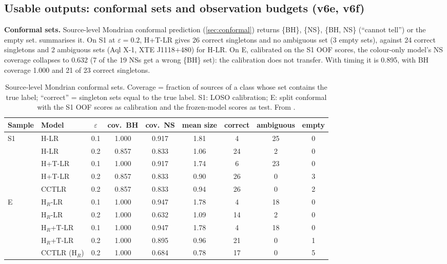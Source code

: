 \subsection{Usable outputs: conformal sets and observation budgets (v6e, v6f)}\label{sec:p3usable}
\Descriptive{} \textbf{Conformal sets.} Source-level Mondrian conformal prediction (\cref{sec:conformal}) returns
\{BH\}, \{NS\}, \{BH, NS\} (``cannot tell'') or the empty set.  summarises it. On S1 at
$\varepsilon=0.2$, H+T-LR gives 26 correct singletons and no ambiguous set (3 empty sets), against 24 correct singletons
and 2 ambiguous sets (Aql X-1, XTE J1118+480) for H-LR. On E, calibrated on the S1 OOF scores, the colour-only model's
NS coverage collapses to 0.632 (7 of the 19 NSs get a wrong \{BH\} set): the calibration does not transfer. With timing it is
0.895, with BH coverage 1.000 and 21 of 23 correct singletons.

\begin{table}[htbp]
\centering\small
\caption[Conformal prediction sets]{\Descriptive{} Source-level Mondrian conformal sets. Coverage = fraction of sources
of a class whose set contains the true label; ``correct'' = singleton sets equal to the true label. S1: LOSO calibration;
E: split conformal with the S1 OOF scores as calibration and the frozen-model scores as test. From
.}
\label{tab:p3conformal}
\setlength{\tabcolsep}{4pt}
\begin{tabular}{@{}llccccccc@{}}
\toprule
Sample & Model & $\varepsilon$ & cov.\ BH & cov.\ NS & mean size & correct & ambiguous & empty \\
\midrule
S1 & H-LR & 0.1 & 1.000 & 0.917 & 1.81 & 4 & 25 & 0 \\
 & H-LR & 0.2 & 0.857 & 0.833 & 1.06 & 24 & 2 & 0 \\
 & H+T-LR & 0.1 & 1.000 & 0.917 & 1.74 & 6 & 23 & 0 \\
 & H+T-LR & 0.2 & 0.857 & 0.833 & 0.90 & 26 & 0 & 3 \\
 & CCTLR & 0.2 & 0.857 & 0.833 & 0.94 & 26 & 0 & 2 \\
\midrule
E & H$_R$-LR & 0.1 & 1.000 & 0.947 & 1.78 & 4 & 18 & 0 \\
 & H$_R$-LR & 0.2 & 1.000 & 0.632 & 1.09 & 14 & 2 & 0 \\
 & H$_R$+T-LR & 0.1 & 1.000 & 0.947 & 1.78 & 4 & 18 & 0 \\
 & H$_R$+T-LR & 0.2 & 1.000 & 0.895 & 0.96 & 21 & 0 & 1 \\
 & CCTLR (H$_R$) & 0.2 & 1.000 & 0.684 & 0.78 & 17 & 0 & 5 \\
\bottomrule
\end{tabular}
\end{table}

